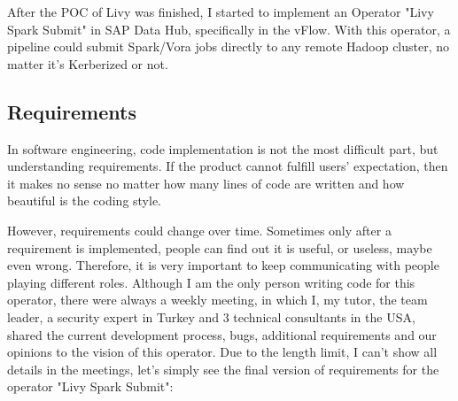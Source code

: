 \documentclass[article,colorback,accentcolor=tud4c]{tudreport}
\begin{document}
After the POC of Livy was finished, I started to implement an Operator "Livy Spark Submit" in SAP Data Hub, specifically in the vFlow. With this operator, a pipeline could submit Spark/Vora jobs directly to any remote Hadoop cluster, no matter it's Kerberized or not. 

	\subsection{Requirements}
	In software engineering, code implementation is not the most difficult part, but understanding requirements. If the product cannot fulfill users' expectation, then it makes no sense no matter how many lines of code are written and how beautiful is the coding style. 
	
	However, requirements could change over time. Sometimes only after a requirement is implemented, people can find out it is useful, or useless, maybe even wrong. Therefore, it is very important to keep communicating with people playing different roles. Although I am the only person writing code for this operator, there were always a weekly meeting, in which I, my tutor, the team leader, a security expert in Turkey and 3 technical consultants in the USA, shared the current development process, bugs, additional requirements and our opinions to the vision of this operator. Due to the length limit, I can't show all details in the meetings, let's simply see the final version of requirements for the operator "Livy Spark Submit":
	
\end{document}
